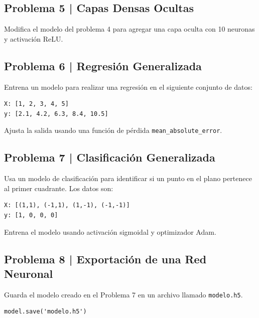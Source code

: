 \documentclass{article}
\begin{document}
\clearpage

\subsection*{Problema 5 | Capas Densas Ocultas}

Modifica el modelo del problema 4 para agregar una capa oculta con 10 neuronas y activación ReLU.

\clearpage

\subsection*{Problema 6 | Regresión Generalizada}

Entrena un modelo para realizar una regresión en el siguiente conjunto de datos:

\begin{verbatim}
X: [1, 2, 3, 4, 5]
y: [2.1, 4.2, 6.3, 8.4, 10.5]
\end{verbatim}

Ajusta la salida usando una función de pérdida \texttt{mean\_absolute\_error}.

\clearpage

\subsection*{Problema 7 | Clasificación Generalizada}

Usa un modelo de clasificación para identificar si un punto en el plano pertenece al primer cuadrante. Los datos son:

\begin{verbatim}
X: [(1,1), (-1,1), (1,-1), (-1,-1)]
y: [1, 0, 0, 0]
\end{verbatim}

Entrena el modelo usando activación sigmoidal y optimizador Adam.

\clearpage

\subsection*{Problema 8 | Exportación de una Red Neuronal}

Guarda el modelo creado en el Problema 7 en un archivo llamado \texttt{modelo.h5}.

\begin{lstlisting}[style=python]
model.save('modelo.h5')
\end{lstlisting}
\end{document}
